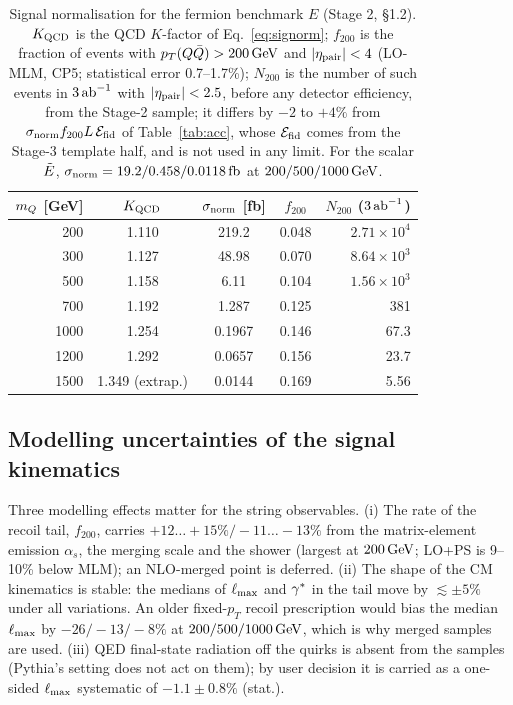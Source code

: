 \begin{table}[htbp]
\centering
\caption{Signal normalisation for the fermion benchmark $E$ (Stage 2,  \S1.2). $K_{\rm QCD}$ is the QCD
$K$-factor of Eq.~\eqref{eq:signorm}; $f_{200}$ is the fraction of events with $p_T(Q\bar Q)>200\,\mathrm{GeV}$ and $|\eta_{\rm pair}|<4$ (LO-MLM, CP5;
statistical error 0.7--1.7\%); $N_{200}$ is the number of such events in $3\,\mathrm{ab}^{-1}$ with $|\eta_{\rm pair}|<2.5$,
before any detector efficiency, from the Stage-2 sample; it differs by $-2$ to $+4\%$ from $\sigma_{\rm norm}f_{200}L\,\mathcal{E}_{\rm fid}$
of Table~\ref{tab:acc}, whose $\mathcal{E}_{\rm fid}$ comes from the Stage-3 template half, and is not used in any limit. For the scalar $\tilde{E}$, $\sigma_{\rm norm}=19.2/0.458/0.0118\,\mathrm{fb}$ at
$200/500/1000\,\mathrm{GeV}$.}
\label{tab:xsec}
\begin{tabular}{rcccr}
\toprule
$m_Q$ [GeV] & $K_{\rm QCD}$ & $\sigma_{\rm norm}$ [fb] & $f_{200}$ & $N_{200}$ ($3\,\mathrm{ab}^{-1}$)\\
\midrule
200  & 1.110 & 219.2  & 0.048 & $2.71\times10^4$\\
300  & 1.127 & 48.98  & 0.070 & $8.64\times10^3$\\
500  & 1.158 & 6.11   & 0.104 & $1.56\times10^3$\\
700  & 1.192 & 1.287  & 0.125 & 381\\
1000 & 1.254 & 0.1967 & 0.146 & 67.3\\
1200 & 1.292 & 0.0657 & 0.156 & 23.7\\
1500 & 1.349 (extrap.) & 0.0144 & 0.169 & 5.56\\
\bottomrule
\end{tabular}
\end{table}

\subsection{Modelling uncertainties of the signal kinematics}\label{sec:model:syst}
Three modelling effects matter for the string observables. (i) The rate of the recoil tail, $f_{200}$, carries
$+12\ldots+15\%/-11\ldots-13\%$ from the matrix-element emission $\alpha_s$, the merging scale and the shower (largest
at $200\,\mathrm{GeV}$; LO+PS is 9--10\% below MLM); an NLO-merged point is deferred. (ii) The shape of the CM kinematics is
stable: the medians of $\ell_{\max}$ and $\gamma^*$ in the tail move by $\lesssim\pm5\%$ under all variations. An older
fixed-$p_T$ recoil prescription would bias the median $\ell_{\max}$ by $-26/-13/-8\%$ at $200/500/1000\,\mathrm{GeV}$, which is why
merged samples are used. (iii) QED final-state radiation off the quirks is absent from the samples (Pythia's setting
does not act on them); by user decision it is carried as a one-sided $\ell_{\max}$ systematic of $-1.1\pm0.8\%$ (stat.).
